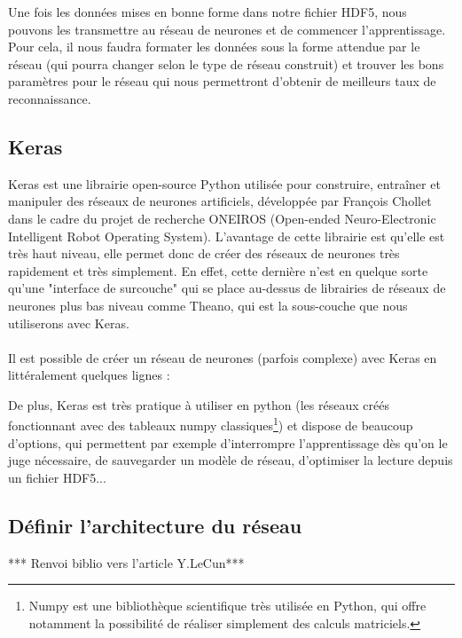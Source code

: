 \documentclass{article}
\begin{document}
Une fois les données mises en bonne forme dans notre fichier HDF5, nous pouvons les transmettre au réseau de neurones et de commencer l'apprentissage. Pour cela, il nous faudra formater les données sous la forme attendue par le réseau (qui pourra changer selon le type de réseau construit) et trouver les bons paramètres pour le réseau qui nous permettront d'obtenir de meilleurs taux de reconnaissance.

\subsection{Keras}

Keras est une librairie open-source Python utilisée pour construire, entraîner et manipuler des réseaux de neurones artificiels, développée par François Chollet dans le cadre du projet de recherche ONEIROS (Open-ended Neuro-Electronic Intelligent Robot Operating System). L'avantage de cette librairie est qu'elle est très haut niveau, elle permet donc de créer des réseaux de neurones très rapidement et très simplement. En effet, cette dernière n'est en quelque sorte qu'une "interface de surcouche" qui se place au-dessus de librairies de réseaux de neurones plus bas niveau comme Theano, qui est la sous-couche que nous utiliserons avec Keras.\\
 \\
Il est possible de créer un réseau de neurones (parfois complexe) avec Keras en littéralement quelques lignes :\\


De plus, Keras est très pratique à utiliser en python (les réseaux créés fonctionnant avec des tableaux numpy classiques\footnote{Numpy est une bibliothèque scientifique très utilisée en Python, qui offre notamment la possibilité de réaliser simplement des calculs matriciels.}) et dispose de beaucoup d'options, qui permettent par exemple d'interrompre l'apprentissage dès qu'on le juge nécessaire, de sauvegarder un modèle de réseau, d'optimiser la lecture depuis un fichier HDF5...

\subsection{Définir l'architecture du réseau}

*** Renvoi biblio vers l'article Y.LeCun***
\end{document}
